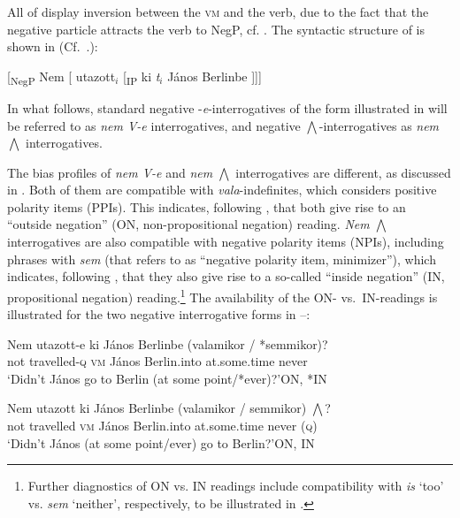 \documentclass[output=paper,colorlinks,citecolor=brown]{langscibook}
\begin{document}
	All of  display inversion between the \textsc{vm} and the verb, due to the fact that the negative particle attracts the verb to NegP, cf. \citet{ekiss2009}. The syntactic structure of  is shown in  (Cf.~\citealt{suranyi2009}.):
	
	\ea\label{ex:neg-syntax}   
	[\textsubscript{NegP} Nem [ utazott$_i$ [\textsubscript{IP} ki \textit{t}$_i$ János Berlinbe ]]]
	\z
	
	
	In what follows, standard negative \nobreakdash-\textit{e}-interrogatives of the form illustrated in  will be referred to as \textit{nem V-e} interrogatives, and negative  $\bigwedge$-interrogatives as \textit{nem  $\bigwedge$} interrogatives. 
	
	The bias profiles of \textit{nem V-e} and \textit{nem $\bigwedge$} interrogatives are different, as discussed in \citet{Gyuris2017}. Both of them are compatible with \textit{vala}-indefi\-ni\-tes, which \citet{szabolcsi2002} considers positive polarity items (PPIs). This indicates, following \citet{ladd81}, that both give rise to an ``outside negation'' (ON, non-propositional negation) reading. 
	\textit{Nem $\bigwedge$} interrogatives are also compatible with negative polarity items (NPIs), including phrases with \textit{sem} (that \citealt{ekiss2009} refers to as ``negative polarity item, minimizer''), which indicates, following \citet{ladd81}, that they also give rise to a so-called ``inside negation'' (IN, propositional negation) reading.\footnote{Further diagnostics of ON vs. IN readings include compatibility with \textit{is} `too' vs. \textit{sem} `neither', respectively, to be illustrated in .} 
	The availability of the ON- vs.~IN-readings is illustrated for the two negative interrogative forms in --: 
	
	\ea\label{ex:nem-utazott-vala?}
	\gll Nem utazott-e	ki	János Berlinbe (valamikor / *semmikor)?\\
	not	travelled-\textsc{q} \textsc{vm} János Berlin.into \hspace{0.15cm}at.some.time {} \hspace{0.2cm}never\\
	\glt `Didn't János go to Berlin (at some point/*ever)?'\hspace{1cm}ON, *IN
	\z
	
	\ea\label{ex:nem-utazott-vala-sem?} 	
	\gll  Nem utazott ki János Berlinbe (valamikor / semmikor) $\bigwedge$?\\
	not	travelled	\textsc{vm} János 	Berlin.into \hspace{0.15cm}at.some.time {} never (\textsc{q})\\ 
	\glt `Didn't János (at some point/ever) go to Berlin?'\hspace{1.2cm}ON, IN
	\z
	
\end{document}
